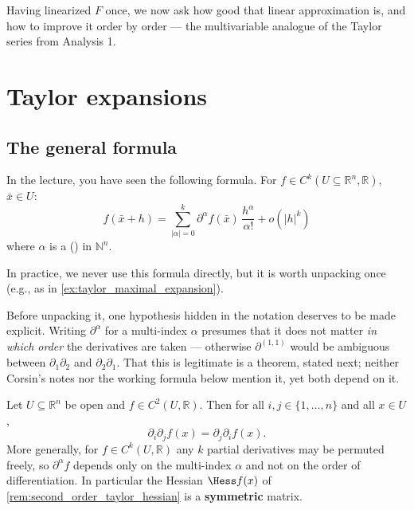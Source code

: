 Having linearized $F$ once, we now ask how good that linear approximation is, and how to improve
it order by order --- the multivariable analogue of the Taylor series from Analysis 1.

\section{Taylor expansions}
\label{sec:taylor_expansions}

\subsection{The general formula}

In the lecture, you have seen the following formula. For
$f \in C^k(U \subseteq \mathbb{R}^n, \mathbb{R})$, $\bar x \in U$:
\[f(\bar x + h) = \sum_{|\alpha| = 0}^{k} \partial^\alpha f(\bar x)\,\frac{h^\alpha}{\alpha!} + o(|h|^k)\]
where $\alpha$ is a  () in $\mathbb{N}^n$.

In practice, we never use this formula directly, but it is worth unpacking once (e.g., as in \cref{ex:taylor_maximal_expansion}).

\begin{ainote}
Before unpacking it, one hypothesis hidden in the notation deserves to be made explicit. Writing
$\partial^\alpha$ for a multi-index $\alpha$ presumes that it does not matter \emph{in which
order} the derivatives are taken --- otherwise $\partial^{(1,1)}$ would be ambiguous between
$\partial_1\partial_2$ and $\partial_2\partial_1$. That this is legitimate is a theorem, stated
next; neither Corsin's notes nor the working formula below mention it, yet both depend on it.
\end{ainote}

\begin{theorem}
\label{thm:schwarz_mixed_partials}
Let $U \subseteq \mathbb{R}^n$ be open and $f \in C^2(U,\mathbb{R})$. Then for all
$i,j \in \{1,\dots,n\}$ and all $x \in U$,
\[\partial_i\partial_j f(x) = \partial_j\partial_i f(x).\]
More generally, for $f \in C^k(U,\mathbb{R})$ any $k$ partial derivatives may be permuted
freely, so $\partial^\alpha f$ depends only on the multi-index $\alpha$ and not on the order of
differentiation. In particular the Hessian $\Hess f(x)$ of
\cref{rem:second_order_taylor_hessian} is a \textbf{symmetric} matrix.
\end{theorem}

